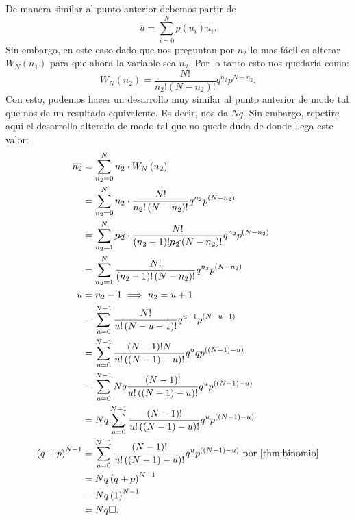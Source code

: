 \documentclass{report}
\begin{document}
De manera similar al punto anterior debemos partir de \[
\overline{u} = \sum_{i=0}^{N} p\left( u_i \right) u_i
.\] 
Sin embargo, en este caso dado que nos preguntan por $n_2$ lo mas fácil es alterar $W_N\left( n_1 \right) $ para que ahora la variable sea $n_2$. Por lo tanto esto nos quedaría como: \[
W_N\left( n_2 \right) = \frac{N!}{n_2!\left( N - n_2 \right)!}q^{n_2}p^{N - n_2}
.\] Con esto, podemos hacer un desarrollo muy similar al punto anterior de modo tal que nos de un resultado equivalente. Es decir, nos da $Nq$.
Sin embargo, repetire aqui el desarrollo alterado de modo tal que no quede duda de donde llega este valor:
\begin{align*}
  \overline{n_2} &= \sum_{n_2=0}^{N} n_2 \cdot  W_N\left( n_2 \right) \\
  &= \sum_{n_2 = 0}^{N} n_2 \cdot  \frac{N!}{n_2!\left( N - n_2 \right)!}q^{n_2}p^{\left( N - n_2 \right) } \\
  &= \sum_{n_2 = 1}^{N} \cancel{n_2} \cdot \frac{N!}{\left( n_2 - 1 \right)! \cancel{n_2} \left( N - n_2 \right)!}q^{n_2}p^{\left( N - n_2 \right) } \\
  &= \sum_{n_2 = 1}^{N} \frac{N!}{\left( n_2 - 1 \right)! \left( N - n_2 \right)!}q^{n_2}p^{\left( N - n_2 \right) } \\
  u &= n_2 - 1 \implies n_2 = u + 1 \\
  &= \sum_{u = 0}^{N - 1} \frac{N!}{u! \left( N - u - 1 \right)! } q^{u + 1} p^{\left( N - u - 1 \right) }\\
  &= \sum_{u = 0}^{N - 1} \frac{\left( N - 1 \right) ! N}{u! \left( \left( N - 1 \right) - u \right)!}q^{u}qp^{\left( \left( N - 1 \right) - u \right) } \\
  &= \sum_{u = 0}^{N - 1} Nq \frac{\left( N - 1 \right)!}{u! \left( \left( N - 1 \right) - u \right)! }q^{u}p^{\left( \left( N - 1 \right) - u \right) } \\
  &= Nq \sum_{u = 0}^{N - 1} \frac{\left( N - 1 \right)!}{u! \left( \left( N - 1 \right) - u \right)! }q^{u}p^{\left( \left( N - 1 \right) - u \right) } \\
  \left( q + p \right)^{N - 1} &= \sum_{u = 0}^{N - 1} \frac{\left( N - 1 \right)!}{u! \left( \left( N - 1 \right) - u \right)! }q^{u}p^{\left( \left( N - 1 \right) - u \right) } \text{ por \ref{thm:binomio}} \\
  &= Nq \left( q + p \right)^{N - 1} \\
  &= Nq \left( 1 \right)^{N - 1} \\
  &= Nq \square
.\end{align*}
\end{document}
